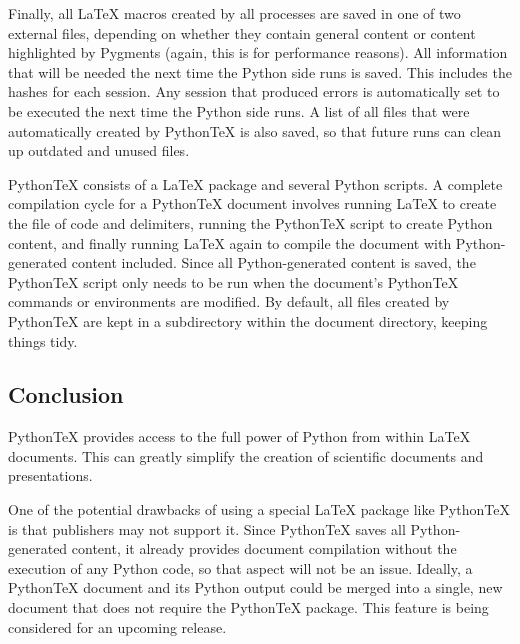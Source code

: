 \documentclass[letterpaper,compsoc,twoside]{IEEEtran}
\begin{document}
Finally, all LaTeX macros created by all processes are saved in
one of two external files, depending on whether they contain general
content or content highlighted by Pygments (again, this is for
performance reasons).  All information that will be needed the next
time the Python side runs is saved.  This includes the hashes for
each session.  Any session that produced errors is automatically set
to be executed the next time the Python side runs.  A list of all files
that were automatically created by PythonTeX is also saved, so
that future runs can clean up outdated and unused files.

PythonTeX consists of a LaTeX package and several Python scripts.
A complete compilation cycle for a PythonTeX document involves running
LaTeX to create the file of code and delimiters, running the PythonTeX
script to create Python content, and finally running LaTeX again
to compile the document with Python-generated content included.  Since
all Python-generated content is saved, the PythonTeX script only needs
to be run when the document's PythonTeX commands or environments are
modified.  By default, all files created by PythonTeX are kept in a
subdirectory within the document directory, keeping things tidy.

\subsection{Conclusion%
  \label{conclusion}%
}


PythonTeX provides access to the full power of Python from within
LaTeX documents.  This can greatly simplify the creation of scientific
documents and presentations.

One of the potential drawbacks of using a special LaTeX package
like PythonTeX is that publishers may not support it.  Since PythonTeX
saves all Python-generated content, it already provides document
compilation without the execution of any Python code, so that aspect will
not be an issue.  Ideally, a PythonTeX document and its Python output
could be merged into a single, new document that does not require the
PythonTeX package.  This feature is being considered for an upcoming release.
\end{document}
